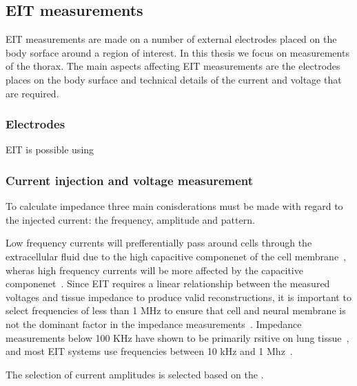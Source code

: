 \subsection{EIT measurements}
EIT measurements are made on a number of external electrodes placed on the body sorface around
a region of interest. In this thesis we focus on measurements of the thorax. The main aspects
affecting EIT measurements are the electrodes places on the body surface and technical details 
of the current and voltage that are required. 
\subsubsection{Electrodes} \label{sec:electrodes}
EIT is possible using 

\subsubsection{Current injection and voltage measurement}
To calculate impedance three main conisderations must be made with regard to the 
injected current: the frequency, amplitude and pattern. 

Low frequency currents will 
prefferentially pass around cells through the extracellular
fluid due to the high capacitive componenet of the cell 
membrane~\parencite{foster_whole-body_1996}, wheras high frequency currents will be 
more affected by the capacitive 
componenet~\parencite{holder_electrical_2004}. 
Since EIT requires a linear relationship between the measured voltages and 
tissue impedance to produce valid reconstructions,
it is important to select frequencies of less than 1 MHz to ensure that cell 
and neural membrane is not the dominant factor in the impedance 
measurements~\parencite{barber_applied_1984}.
Impedance measurements below 100 KHz have shown to be primarily rsitive on lung
tissue~\parencite{witsoe_electrical_1967}, and most EIT systems use
frequencies between 10 kHz and 1 Mhz~\parencite{holder_electrical_2004}.

The selection of current amplitudes is selected based on the .

